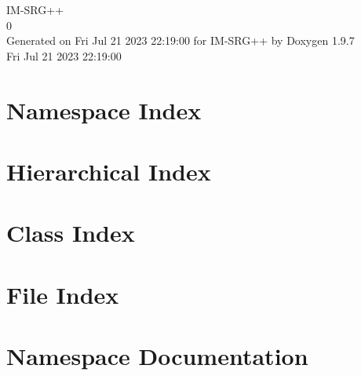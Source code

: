 \documentclass[twoside]{book}
\newcommand{\+}{\discretionary{\mbox{\scriptsize$\hookleftarrow$}}{}{}}
\newcommand{\clearemptydoublepage}{%
    \newpage{\pagestyle{empty}\cleardoublepage}%
  }
\begin{document}
  \raggedbottom
    \hypersetup{pageanchor=false,
                bookmarksnumbered=true,
                pdfencoding=unicode
               }
  \begin{titlepage}
  \vspace*{7cm}
  \begin{center}%
  {\Large IM-\/\+SRG++}\\
  [1ex]\large 0 \\
  \vspace*{1cm}
  {\large Generated on Fri Jul 21 2023 22\+:19\+:00 for IM-\/\+SRG++ by Doxygen 1.9.7}\\
    \vspace*{0.5cm}
    {\small Fri Jul 21 2023 22:19:00}
  \end{center}
  \end{titlepage}
  \clearemptydoublepage
  \tableofcontents
  \clearemptydoublepage
  \hypersetup{pageanchor=true}

\chapter{Namespace Index}

\chapter{Hierarchical Index}

\chapter{Class Index}

\chapter{File Index}

\chapter{Namespace Documentation}






\end{document}
